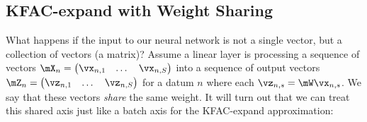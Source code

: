 \subsection{KFAC-expand with Weight Sharing}

What happens if the input to our neural network is not a single vector, but a collection of vectors (\ie a matrix)? Assume a linear layer is processing a sequence of vectors $\mX_n =
\begin{pmatrix} \vx_{n,1} & \dots & \vx_{n,S} \end{pmatrix}$ into a sequence of output vectors $\mZ_n =
\begin{pmatrix} \vz_{n,1} & \dots & \vz_{n,S} \end{pmatrix}$ for a datum $n$ where each $\vz_{n,s} = \mW \vx_{n,s}$.
We say that these vectors \emph{share} the same weight.
It will turn out that we can treat this shared axis just like a batch axis for the KFAC-expand approximation:

